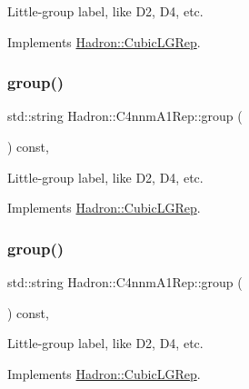 Little-\/group label, like D2, D4, etc. 

Implements \mbox{\hyperlink{structHadron_1_1CubicLGRep_a9bdb14b519a611d21379ed96a3a9eb41}{Hadron\+::\+Cubic\+L\+G\+Rep}}.

\mbox{\label{structHadron_1_1C4nnmA1Rep_a327b4756034037f9a38a5944d4f98d22}} 
\subsubsection{\texorpdfstring{group()}{group()}\hspace{0.1cm}{\footnotesize\ttfamily [3/5]}}
{\footnotesize\ttfamily std\+::string Hadron\+::\+C4nnm\+A1\+Rep\+::group (\begin{DoxyParamCaption}{ }\end{DoxyParamCaption}) const\hspace{0.3cm}{\ttfamily [inline]}, {\ttfamily [virtual]}}

Little-\/group label, like D2, D4, etc. 

Implements \mbox{\hyperlink{structHadron_1_1CubicLGRep_a9bdb14b519a611d21379ed96a3a9eb41}{Hadron\+::\+Cubic\+L\+G\+Rep}}.

\mbox{\label{structHadron_1_1C4nnmA1Rep_a327b4756034037f9a38a5944d4f98d22}} 
\subsubsection{\texorpdfstring{group()}{group()}\hspace{0.1cm}{\footnotesize\ttfamily [4/5]}}
{\footnotesize\ttfamily std\+::string Hadron\+::\+C4nnm\+A1\+Rep\+::group (\begin{DoxyParamCaption}{ }\end{DoxyParamCaption}) const\hspace{0.3cm}{\ttfamily [inline]}, {\ttfamily [virtual]}}

Little-\/group label, like D2, D4, etc. 

Implements \mbox{\hyperlink{structHadron_1_1CubicLGRep_a9bdb14b519a611d21379ed96a3a9eb41}{Hadron\+::\+Cubic\+L\+G\+Rep}}.

\mbox{\label{structHadron_1_1C4nnmA1Rep_a327b4756034037f9a38a5944d4f98d22}} 
